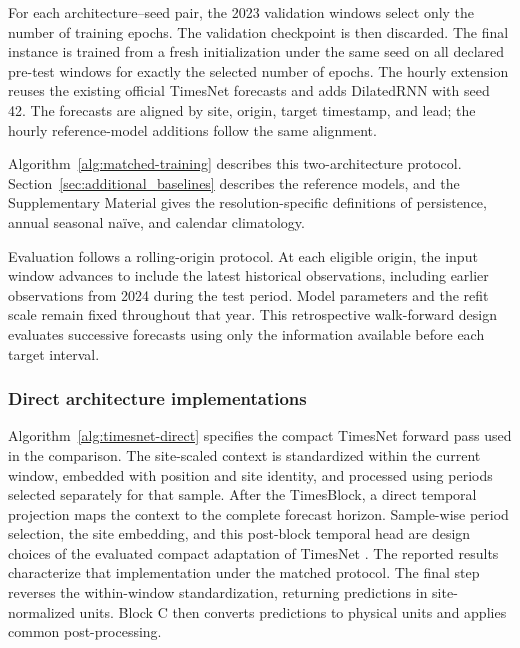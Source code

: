 For each architecture--seed pair, the 2023 validation windows select only the
number of training epochs. The validation checkpoint is then discarded. The
final instance is trained from a fresh initialization under the same seed on
all declared pre-test windows for exactly the selected number of epochs.
The hourly extension reuses the existing official TimesNet forecasts and adds
DilatedRNN with seed 42. The forecasts are aligned by site, origin,
target timestamp, and lead; the hourly reference-model additions follow the
same alignment.

Algorithm~\ref{alg:matched-training} describes this two-architecture protocol.
Section~\ref{sec:additional_baselines} describes the reference models, and
the Supplementary Material gives the resolution-specific definitions of
persistence, annual seasonal na\"ive, and calendar climatology.



Evaluation follows a rolling-origin protocol. At each eligible origin,
the input window advances to include the latest historical observations,
including earlier observations from 2024 during the test period.
Model parameters and the refit scale remain fixed throughout that year.
This retrospective walk-forward design evaluates successive forecasts
using only the information available before each target interval.

\subsubsection{Direct architecture implementations}

Algorithm~\ref{alg:timesnet-direct} specifies the compact TimesNet forward
pass used in the comparison. The site-scaled context is standardized within
the current window, embedded with position and site identity, and processed
using periods selected separately for that sample. After the TimesBlock,
a direct temporal projection maps the context to the complete forecast
horizon. Sample-wise period selection, the site embedding, and this
post-block temporal head are design choices of the evaluated compact
adaptation of TimesNet \cite{wu2023}. The reported results characterize that
implementation under the matched protocol. The final step reverses the
within-window standardization, returning predictions in site-normalized units.
Block C then converts predictions to physical units and applies common
post-processing.



